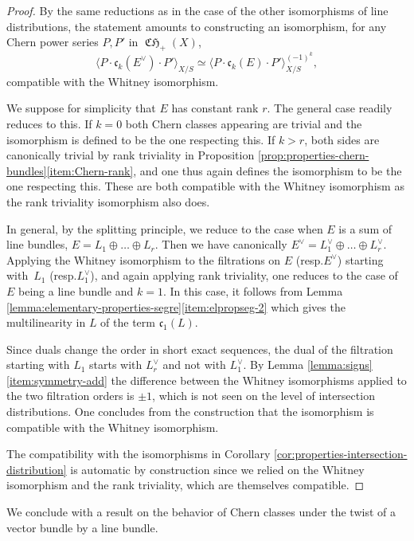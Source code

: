 \documentclass[11pt]{article}
\newcommand{\resp}{resp.\xspace}
\theoremstyle{plain}
\theoremstyle{definition}
\newcommand{\cfrak}{\mathfrak c}
\DeclareMathOperator{\CHfrak}{\mathfrak{CH}}
\begin{document}
\begin{proof}
By the same reductions as in the case of the other isomorphisms of line distributions, the statement amounts to constructing an isomorphism, for any Chern power series $P, P'$ in $\CHfrak_+(X)$,
\begin{displaymath}
\langle P \cdot \cfrak_k(E^\vee) \cdot P' \rangle_{X/S} \simeq \langle P \cdot \cfrak_k(E) \cdot P' \rangle_{X/S}^{(-1)^k},
\end{displaymath}
compatible with the Whitney isomorphism.

We suppose for simplicity that $E$ has constant rank $r$. The general case readily reduces to this. If $k = 0$ both Chern classes appearing are trivial and the isomorphism is defined to be the one respecting this. If $k>r$, both sides are canonically trivial by rank triviality in Proposition \ref{prop:properties-chern-bundles}\eqref{item:Chern-rank}, and one thus again defines the isomorphism to be the one respecting this. These are both compatible with the Whitney isomorphism as the rank triviality isomorphism also does.

In general, by the splitting principle, we reduce to the case when $E$ is a sum of line bundles, $E = L_1 \oplus \ldots \oplus L_r$. Then we have canonically $E^\vee = L_1^\vee \oplus \ldots \oplus L_r^\vee$. Applying the Whitney isomorphism to the filtrations on $E$ (\resp $E^\vee$) starting with~$L_1$ (\resp $L_1^\vee$), and again applying rank triviality, one reduces to the case of $E$ being a line bundle and $k = 1$. In this case, it follows from Lemma \ref{lemma:elementary-properties-segre}\eqref{item:elpropseg-2} which gives the multilinearity in $L$ of the term $\cfrak_1(L)$.

Since duals change the order in short exact sequences, the dual of the filtration starting with $L_1$ starts with $L_r^\vee$ and not with $L_1^\vee$. By Lemma \ref{lemma:signs}\eqref{item:symmetry-add} the difference between the Whitney isomorphisms applied to the two filtration orders is $\pm 1$, which is not seen on the level of intersection distributions. One concludes from the construction that the isomorphism is compatible with the Whitney isomorphism.

The compatibility with the isomorphisms in Corollary \ref{cor:properties-intersection-distribution} is automatic by construction since we relied on the Whitney isomorphism and the rank triviality, which are themselves compatible.
\end{proof}

We conclude with a result on the behavior of Chern classes under the twist of a vector bundle by a line bundle.
\end{document}
